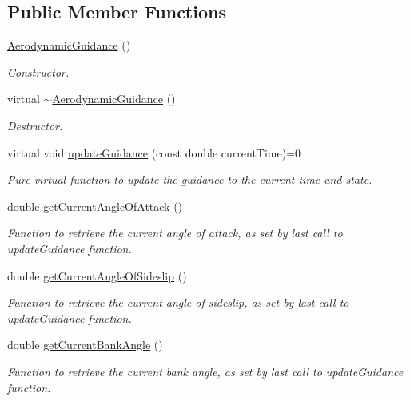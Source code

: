 \subsection*{Public Member Functions}
\begin{DoxyCompactItemize}
\item 
\hyperlink{classtudat_1_1aerodynamics_1_1AerodynamicGuidance_aaf4f9cfc62d861c1e2c4438d9cfb84cb}{Aerodynamic\+Guidance} ()\hypertarget{classtudat_1_1aerodynamics_1_1AerodynamicGuidance_aaf4f9cfc62d861c1e2c4438d9cfb84cb}{}\label{classtudat_1_1aerodynamics_1_1AerodynamicGuidance_aaf4f9cfc62d861c1e2c4438d9cfb84cb}

\begin{DoxyCompactList}\small\item\em Constructor. \end{DoxyCompactList}\item 
virtual \hyperlink{classtudat_1_1aerodynamics_1_1AerodynamicGuidance_a01f1a9a23bc8d0794003909d61385ab1}{$\sim$\+Aerodynamic\+Guidance} ()\hypertarget{classtudat_1_1aerodynamics_1_1AerodynamicGuidance_a01f1a9a23bc8d0794003909d61385ab1}{}\label{classtudat_1_1aerodynamics_1_1AerodynamicGuidance_a01f1a9a23bc8d0794003909d61385ab1}

\begin{DoxyCompactList}\small\item\em Destructor. \end{DoxyCompactList}\item 
virtual void \hyperlink{classtudat_1_1aerodynamics_1_1AerodynamicGuidance_a97a6200cf74d60a2a5ad1616e159ffc5}{update\+Guidance} (const double current\+Time)=0
\begin{DoxyCompactList}\small\item\em Pure virtual function to update the guidance to the current time and state. \end{DoxyCompactList}\item 
double \hyperlink{classtudat_1_1aerodynamics_1_1AerodynamicGuidance_ac8d09c3926209eb3d440484c0580f6ea}{get\+Current\+Angle\+Of\+Attack} ()
\begin{DoxyCompactList}\small\item\em Function to retrieve the current angle of attack, as set by last call to update\+Guidance function. \end{DoxyCompactList}\item 
double \hyperlink{classtudat_1_1aerodynamics_1_1AerodynamicGuidance_a3ea3dcb8ee9f99f5107ad1aa86b23ae3}{get\+Current\+Angle\+Of\+Sideslip} ()
\begin{DoxyCompactList}\small\item\em Function to retrieve the current angle of sideslip, as set by last call to update\+Guidance function. \end{DoxyCompactList}\item 
double \hyperlink{classtudat_1_1aerodynamics_1_1AerodynamicGuidance_a342513b4fa99f1f09365ff4f7a3c572f}{get\+Current\+Bank\+Angle} ()
\begin{DoxyCompactList}\small\item\em Function to retrieve the current bank angle, as set by last call to update\+Guidance function. \end{DoxyCompactList}\end{DoxyCompactItemize}
